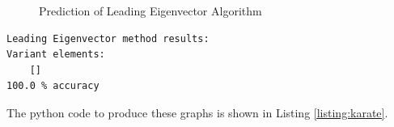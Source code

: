 \begin{figure}[h!]
\centering
{}
\caption{Prediction of Leading Eigenvector Algorithm}
\label{fig:graph_le}
\end{figure}

\begin{verbatim}
Leading Eigenvector method results: 
Variant elements:
	[]
100.0 % accuracy
\end{verbatim}


\clearpage

The python code to produce these graphs is shown in Listing \ref{listing:karate}.



